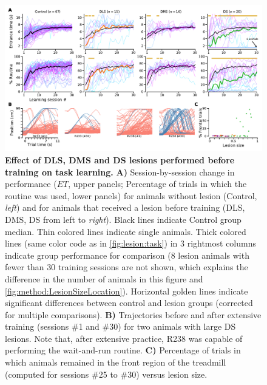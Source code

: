 \begin{figure}[bth!]
	\begin{center}
		\includegraphics[width=\textwidth]{ch-lesion/figures/EarlyLesionLearning.pdf}
		\caption[Effects of Striatal Lesions on Learning]
		{\textbf{Effect of DLS, DMS and DS lesions performed before training on task learning.}
		\textbf{A)} Session-by-session change in performance ($ET$, upper panels; Percentage of trials in which the routine was used, lower panels) for animals without lesion (Control, \textit{left}) and for animals that received a lesion before training (DLS, DMS, DS from left to \textit{right}).
		Black lines indicate Control group median.
		Thin colored lines indicate single animals.
		Thick colored lines (same color code as in \autoref{fig:lesion:task}) in 3 rightmost columns indicate group performance for comparison (8 lesion animals with fewer than 30 training sessions are not shown, which explains the difference in the number of animals in this figure and \autoref{fig:method:LesionSizeLocation}).
		Horizontal golden lines indicate significant differences between control and lesion groups (corrected for multiple comparisons).
		\textbf{B)} Trajectories before and after extensive training (sessions \#1 and \#30) for two animals with large DS lesions.
		Note that, after extensive practice, R238 was capable of performing the wait-and-run routine.
		\textbf{C)} Percentage of trials in which animals remained in the front region of the treadmill (computed for sessions \#25 to \#30) versus lesion size.
		}
		\label{fig:lesion:EarlyLesionLearning}
	\end{center}
\end{figure}